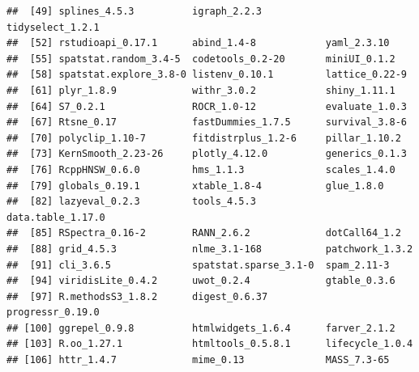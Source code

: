 \documentclass[
]{article}
\begin{document}
\begin{verbatim}
##  [49] splines_4.5.3          igraph_2.2.3           tidyselect_1.2.1      
##  [52] rstudioapi_0.17.1      abind_1.4-8            yaml_2.3.10           
##  [55] spatstat.random_3.4-5  codetools_0.2-20       miniUI_0.1.2          
##  [58] spatstat.explore_3.8-0 listenv_0.10.1         lattice_0.22-9        
##  [61] plyr_1.8.9             withr_3.0.2            shiny_1.11.1          
##  [64] S7_0.2.1               ROCR_1.0-12            evaluate_1.0.3        
##  [67] Rtsne_0.17             fastDummies_1.7.5      survival_3.8-6        
##  [70] polyclip_1.10-7        fitdistrplus_1.2-6     pillar_1.10.2         
##  [73] KernSmooth_2.23-26     plotly_4.12.0          generics_0.1.3        
##  [76] RcppHNSW_0.6.0         hms_1.1.3              scales_1.4.0          
##  [79] globals_0.19.1         xtable_1.8-4           glue_1.8.0            
##  [82] lazyeval_0.2.3         tools_4.5.3            data.table_1.17.0     
##  [85] RSpectra_0.16-2        RANN_2.6.2             dotCall64_1.2         
##  [88] grid_4.5.3             nlme_3.1-168           patchwork_1.3.2       
##  [91] cli_3.6.5              spatstat.sparse_3.1-0  spam_2.11-3           
##  [94] viridisLite_0.4.2      uwot_0.2.4             gtable_0.3.6          
##  [97] R.methodsS3_1.8.2      digest_0.6.37          progressr_0.19.0      
## [100] ggrepel_0.9.8          htmlwidgets_1.6.4      farver_2.1.2          
## [103] R.oo_1.27.1            htmltools_0.5.8.1      lifecycle_1.0.4       
## [106] httr_1.4.7             mime_0.13              MASS_7.3-65
\end{verbatim}
\end{document}
